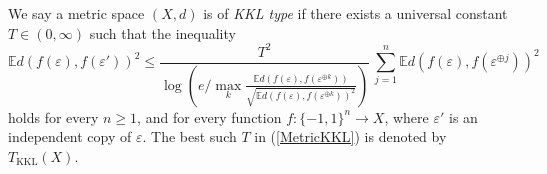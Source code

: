 \begin{defn}
We say a metric space $(X,d)$ is of  \textit{KKL type} if there exists a universal constant $T\in (0,\infty)$ such that the inequality 
\begin{equation}  
\mathbb{E}d(f(\varepsilon),f(\varepsilon'))^2 \leq \frac{T^{2}}{\log\left(e/\max\limits_k\frac{\mathbb{E}d(f(\varepsilon),f(\varepsilon^{\oplus k}))}{\sqrt{\mathbb{E}d(f(\varepsilon),f(\varepsilon^{\oplus k}))^2}}\right)}\, \sum_{j=1}^{n} \mathbb{E}d(f(\varepsilon),f(\varepsilon^{\oplus j}))^2 \label{MetricKKL}
\end{equation}
 holds for every $n\geq 1$, and for every function $f:\{-1,1\}^n \to X$, where $\varepsilon'$ is an independent copy of $\varepsilon$. The best such $T$  in (\ref{MetricKKL}) is denoted by $T_{\mathrm{KKL}}(X)$. 
\end{defn}
